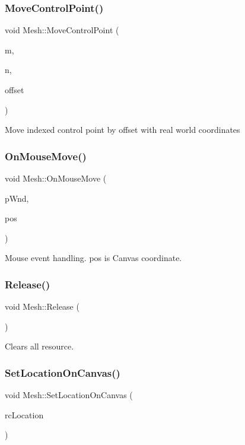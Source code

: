 \subsubsection{\texorpdfstring{Move\+Control\+Point()}{MoveControlPoint()}}
{\footnotesize\ttfamily void Mesh\+::\+Move\+Control\+Point (\begin{DoxyParamCaption}\item[{int}]{m,  }\item[{int}]{n,  }\item[{P\+O\+I\+NT}]{offset }\end{DoxyParamCaption})}

Move indexed control point by offset with real world coordinates \mbox{\label{class_mesh_ad644e7f3d14e64774bc32c356898109c}} 
\subsubsection{\texorpdfstring{On\+Mouse\+Move()}{OnMouseMove()}}
{\footnotesize\ttfamily void Mesh\+::\+On\+Mouse\+Move (\begin{DoxyParamCaption}\item[{C\+Wnd $\ast$}]{p\+Wnd,  }\item[{P\+O\+I\+NT}]{pos }\end{DoxyParamCaption})}

Mouse event handling. pos is Canvas coordinate. \mbox{\label{class_mesh_a2c9670a5720afe8ee5bcaa6c433455d5}} 
\subsubsection{\texorpdfstring{Release()}{Release()}}
{\footnotesize\ttfamily void Mesh\+::\+Release (\begin{DoxyParamCaption}{ }\end{DoxyParamCaption})}

Clears all resource. \mbox{\label{class_mesh_a28a00f1a751e2a5cca3425670befc376}} 
\subsubsection{\texorpdfstring{Set\+Location\+On\+Canvas()}{SetLocationOnCanvas()}}
{\footnotesize\ttfamily void Mesh\+::\+Set\+Location\+On\+Canvas (\begin{DoxyParamCaption}\item[{R\+E\+CT \&}]{rc\+Location }\end{DoxyParamCaption})}

